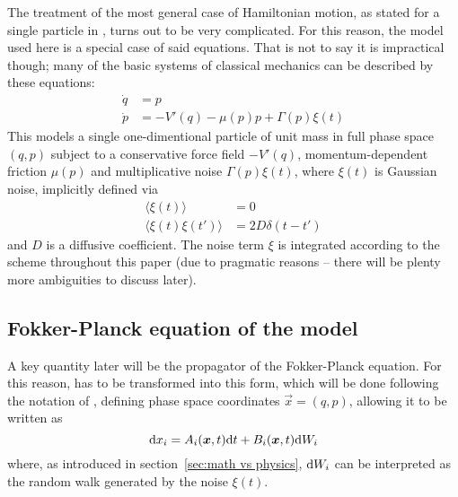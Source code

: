 The treatment of the most general case of Hamiltonian motion, as stated for a single particle in , turns out to be very complicated. For this reason, the model used here is a special case of said equations. That is not to say it is impractical though; many of the basic systems of classical mechanics can be described by these equations:
%
\begin{equation}\boxed{\begin{split}
	\label{eqn:model hamiltonian eqns of motion}
	\dot q &= p \\
	\dot p &= -V'(q) - \mu(p)p + \Gamma(p)\xi(t)
\end{split}}\end{equation}
%
This models a single one-dimentional particle of unit mass in full phase space \((q,p)\) subject to a conservative force field \(-V'(q)\), momentum-dependent friction \(\mu(p)\) and multiplicative noise \(\Gamma(p)\xi(t)\), where \(\xi(t)\) is Gaussian noise, implicitly defined via
%
\begin{equation}\begin{split}
	\langle\xi(t)\rangle &= 0 \\
	\langle\xi(t)\xi(t')\rangle &= 2D\delta(t-t')
\end{split}\end{equation}
%
and \(D\) is a diffusive coefficient. The noise term \(\xi\) is integrated according to the \Ito{} scheme throughout this paper (due to pragmatic reasons -- there will be plenty more ambiguities to discuss later).





\subsection{Fokker-Planck equation of the model}

A key quantity later will be the propagator of the Fokker-Planck equation. For this reason,  has to be transformed into this form, which will be done following the notation of , defining phase space coordinates \(\vec x = (q,p)\), allowing it to be written as
%
\begin{equation}
	\mathrm{d} x_i = A_i(\boldsymbol{x},t)\mathrm{d} t + B_i(\boldsymbol{x}, t)\mathrm{d} W_i
\end{equation}
%
where, as introduced in section~\ref{sec:math vs physics}, \(\mathrm{d} W_i\) can be interpreted as the random walk generated by the noise \(\xi(t)\).

